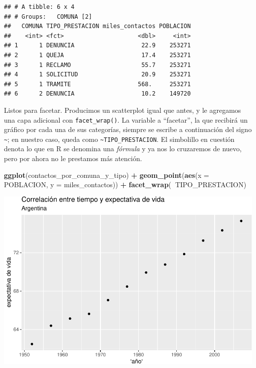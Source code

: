 \documentclass[]{book}
\newenvironment{Shaded}{\begin{snugshade}}{\end{snugshade}}
\newcommand{\KeywordTok}[1]{\textcolor[rgb]{0.13,0.29,0.53}{\textbf{#1}}}
\newcommand{\DataTypeTok}[1]{\textcolor[rgb]{0.13,0.29,0.53}{#1}}
\newcommand{\StringTok}[1]{\textcolor[rgb]{0.31,0.60,0.02}{#1}}
\newcommand{\OperatorTok}[1]{\textcolor[rgb]{0.81,0.36,0.00}{\textbf{#1}}}
\newcommand{\NormalTok}[1]{#1}
\begin{document}
\begin{verbatim}
## # A tibble: 6 x 4
## # Groups:   COMUNA [2]
##   COMUNA TIPO_PRESTACION miles_contactos POBLACION
##    <int> <fct>                     <dbl>     <int>
## 1      1 DENUNCIA                   22.9    253271
## 2      1 QUEJA                      17.4    253271
## 3      1 RECLAMO                    55.7    253271
## 4      1 SOLICITUD                  20.9    253271
## 5      1 TRAMITE                   568.     253271
## 6      2 DENUNCIA                   10.2    149720
\end{verbatim}

Listos para facetar. Producimos un scatterplot igual que antes, y le
agregamos una capa adicional con \texttt{facet\_wrap()}. La variable a
``facetar'', la que recibirá un gráfico por cada una de sus categorías,
siempre se escribe a continuación del signo \texttt{\textasciitilde{}};
en nuestro caso, queda como \texttt{\textasciitilde{}TIPO\_PRESTACION}.
El simbolillo en cuestión denota lo que en R se denomina una
\emph{fórmula} y ya nos lo cruzaremos de nuevo, pero por ahora no le
prestamos más atención.

\begin{Shaded}
\begin{Highlighting}[]
\KeywordTok{ggplot}\NormalTok{(contactos_por_comuna_y_tipo) }\OperatorTok{+}\StringTok{ }
\StringTok{    }\KeywordTok{geom_point}\NormalTok{(}\KeywordTok{aes}\NormalTok{(}\DataTypeTok{x =}\NormalTok{ POBLACION, }\DataTypeTok{y =}\NormalTok{ miles_contactos)) }\OperatorTok{+}
\StringTok{    }\KeywordTok{facet_wrap}\NormalTok{(}\OperatorTok{~}\NormalTok{TIPO_PRESTACION)}
\end{Highlighting}
\end{Shaded}

\includegraphics{ciencia_de_datos_politicas_publicas_files/figure-latex/unnamed-chunk-91-1.pdf}
\end{document}
